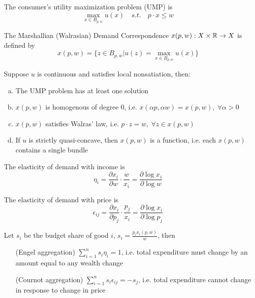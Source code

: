 
\begin{definition}[UMP]
  The consumer's utility maximization problem (UMP) is
  \[
  \max_{x\in B_{p,w}} u(x) \quad s.t. \quad p \cdot x \leq w
  \]
\end{definition}

\begin{definition}
  The Marshallian (Walrasian) Demand Correspondence $x(p,w) : X \times
  {\mathbb R} \to X$ is defined by
  \[
  x(p,w) = \{z \in B_{p,w} | u(z) = \max_{x \in B_{p,w}} u(x) \}
  \]
\end{definition}

\begin{prop}
  Suppose $u$ is continuous and satisfies local nonsatiation, then:
  \begin{enumerate}[(a)]
  \item The UMP problem has at least one solution
  \item $x(p,w)$ is homogenous of degree $0$, i.e. $x(\alpha p, \alpha
    w) = x(p,w), \; \forall \alpha > 0$
  \item $x(p,w)$ satisfies Walras' law, i.e. $p \cdot z = w, \;
    \forall z \in x(p,w)$
  \item If $u$ is strictly quasi-concave, then $x(p,w)$ is a function,
    i.e. each $x(p,w)$ contains a single bundle
  \end{enumerate}
\end{prop}

\begin{definition}

  The elasticity of demand with income is 
  \[
  \eta_i = \frac{\partial x_i}{\partial w} \cdot \frac{w}{x_i}
  = \frac{\partial \log x_i}{\partial \log w}
  \]

  The elasticity of demand with price is 
  \[
  \epsilon_{ij}= \frac{\partial x_i}{\partial p_j} \cdot \frac{p_j}{x_i}
  = \frac{\partial \log x_i}{\partial \log p_j}
  \]
\end{definition}

\begin{prop}
  Let $s_i$ be the budget share of good $i$, $s_i = \frac{p_i
    x_i(p,w)}{w}$, then
  \begin{itemize}
  \item[(Engel aggregation)] $ \sum_{i=1}^n s_i \eta_i = 1$,
    i.e. total expenditure must change by an amount equal to any
    wealth change
  \item[(Cournot aggregation)] $ \sum_{i=1}^n s_i \epsilon_{ij} =
    -s_j$, i.e. total expenditure cannot change in response to change
    in price
  \end{itemize}
\end{prop}

